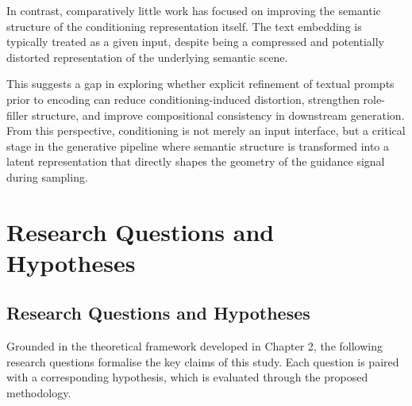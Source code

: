 \documentclass[a4paper,twoside,12pt]{report}
\begin{document}
In contrast, comparatively little work has focused on improving the semantic structure of the conditioning representation itself. The text embedding is typically treated as a given input, despite being a compressed and potentially distorted representation of the underlying semantic scene.

This suggests a gap in exploring whether explicit refinement of textual prompts prior to encoding can reduce conditioning-induced distortion, strengthen role-filler structure, and improve compositional consistency in downstream generation. From this perspective, conditioning is not merely an input interface, but a critical stage in the generative pipeline where semantic structure is transformed into a latent representation that directly shapes the geometry of the guidance signal during sampling.

\chapter{Research Questions and Hypotheses}

\section{Research Questions and Hypotheses}

Grounded in the theoretical framework developed in Chapter 2, the following research questions formalise the key claims of this study. Each question is paired with a corresponding hypothesis, which is evaluated through the proposed methodology.
\end{document}
